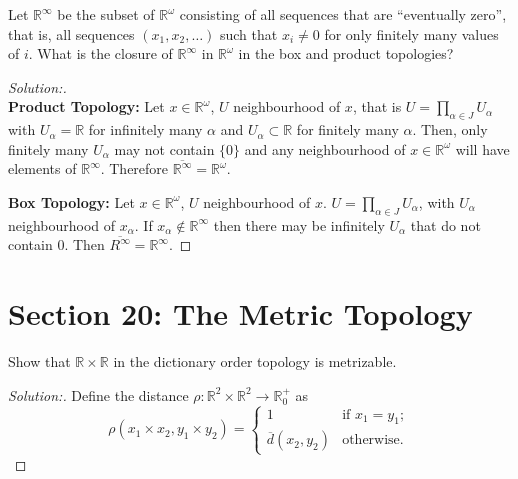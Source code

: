 \documentclass[a4paper,12pt, reqno]{article}
\theoremstyle{definition}
\newenvironment{exerr}[1]{
  \renewcommand\theexeralt{#1}
  \exeralt
}{\endexeralt}
\newenvironment{solution}{\begin{proof}[Solution:]}{\end{proof}}
\newcommand{\R}{\mathbb{R}}
\begin{document}
\begin{exerr}{7}
  Let $\R^\infty$ be the subset of $\R^\omega$ consisting of all sequences that are ``eventually zero'', that is, all sequences $(x_{1},x_{2},\dots)$ such that $x_{i}\neq0$ for only finitely many values of $i$. What is the closure of $\R^\infty$ in $\R^\omega$ in the box and product topologies?
\end{exerr}
\begin{solution}\hfill\\

  \noindent\textbf{Product Topology:} Let $x\in\R^\omega$, $U$ neighbourhood of $x$, that is $U = \prod_{\alpha\in J} U_{\alpha}$ with $U_{\alpha} = \R$ for infinitely many $\alpha$ and $U_{\alpha}\subset\R$ for finitely  many $\alpha$. Then, only finitely many $U_{\alpha}$ may not contain $\{ 0 \}$ and any neighbourhood of $x\in\R^\omega$ will have elements of $\R^\infty$. Therefore $\overline{\R^\infty} = \R^\omega$.

  \noindent\textbf{Box Topology:} Let $x\in\R^\omega$, $U$ neighbourhood of $x$. $U = \prod_{\alpha\in J}U_{\alpha}$, with $U_{\alpha}$ neighbourhood of $x_{\alpha}$. If $x_{\alpha}\notin\R^\infty$ then there may be infinitely $U_{\alpha}$ that do not contain $0$. Then $\overline{R^\infty}=\R^{\infty}$.
\end{solution}

\section*{Section 20: The Metric Topology}

\begin{exerr}{2}
  Show that $\R\times\R$ in the dictionary order topology is metrizable.
\end{exerr}
\begin{solution}
  Define the distance $\rho:\R^2\times\R^2\to\R^+_{0}$ as
  \begin{equation*}
    \rho(x_{1}\times x_{2}, y_{1}\times y_{2}) = \begin{cases}
      1                         & \text{if }x_{1} = y_{1}; \\
      \overline{d}(x_{2},y_{2}) & \text{otherwise}.
    \end{cases}
  \end{equation*}
\end{solution}
\end{document}
